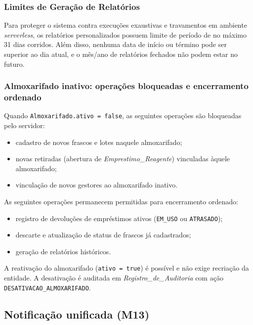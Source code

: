 \subsubsection{Limites de Geração de Relatórios}
\begin{regra}
Para proteger o sistema contra execuções exaustivas e travamentos em ambiente \textit{serverless}, os relatórios personalizados possuem limite de período de no máximo 31 dias corridos. Além disso, nenhuma data de início ou término pode ser superior ao dia atual, e o mês/ano de relatórios fechados não podem estar no futuro.
\end{regra}

\subsubsection{Almoxarifado inativo: operações bloqueadas e encerramento ordenado}
\label{sec:regras-almoxarifado-inativo}
\begin{regra}
Quando \texttt{Almoxarifado.ativo = false}, as seguintes operações são bloqueadas pelo servidor:
\begin{itemize}
    \item cadastro de novos frascos e lotes naquele almoxarifado;
    \item novas retiradas (abertura de \textit{Emprestimo\_Reagente}) vinculadas àquele almoxarifado;
    \item vinculação de novos gestores ao almoxarifado inativo.
\end{itemize}
As seguintes operações permanecem permitidas para encerramento ordenado:
\begin{itemize}
    \item registro de devoluções de empréstimos ativos (\texttt{EM\_USO} ou \texttt{ATRASADO});
    \item descarte e atualização de status de frascos já cadastrados;
    \item geração de relatórios históricos.
\end{itemize}
A reativação do almoxarifado (\texttt{ativo = true}) é possível e não exige recriação da entidade. A desativação é auditada em \textit{Registro\_de\_Auditoria} com ação \texttt{DESATIVACAO\_ALMOXARIFADO}.
\end{regra}

\subsection{Notificação unificada (M13)}
\label{sec:regras-notificacoes-m13}

